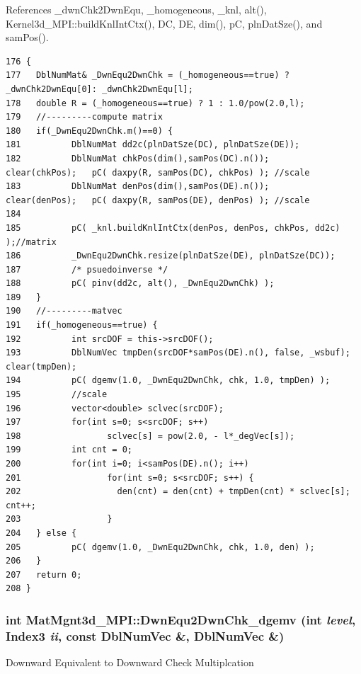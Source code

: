 References \_\-dwn\-Chk2Dwn\-Equ, \_\-homogeneous, \_\-knl, alt(), Kernel3d\_\-MPI::build\-Knl\-Int\-Ctx(), DC, DE, dim(), p\-C, pln\-Dat\-Sze(), and sam\-Pos().

\footnotesize\begin{verbatim}176 {
177   DblNumMat& _DwnEqu2DwnChk = (_homogeneous==true) ? _dwnChk2DwnEqu[0]: _dwnChk2DwnEqu[l];
178   double R = (_homogeneous==true) ? 1 : 1.0/pow(2.0,l);
179   //---------compute matrix
180   if(_DwnEqu2DwnChk.m()==0) {    
181          DblNumMat dd2c(plnDatSze(DC), plnDatSze(DE));
182          DblNumMat chkPos(dim(),samPos(DC).n());                clear(chkPos);   pC( daxpy(R, samPos(DC), chkPos) ); //scale
183          DblNumMat denPos(dim(),samPos(DE).n());                clear(denPos);   pC( daxpy(R, samPos(DE), denPos) ); //scale
184          
185          pC( _knl.buildKnlIntCtx(denPos, denPos, chkPos, dd2c) );//matrix
186          _DwnEqu2DwnChk.resize(plnDatSze(DE), plnDatSze(DC));
187          /* psuedoinverse */
188          pC( pinv(dd2c, alt(), _DwnEqu2DwnChk) );
189   }
190   //---------matvec
191   if(_homogeneous==true) {
192          int srcDOF = this->srcDOF();
193          DblNumVec tmpDen(srcDOF*samPos(DE).n(), false, _wsbuf);         clear(tmpDen);
194          pC( dgemv(1.0, _DwnEqu2DwnChk, chk, 1.0, tmpDen) );
195          //scale
196          vector<double> sclvec(srcDOF);
197          for(int s=0; s<srcDOF; s++)
198                 sclvec[s] = pow(2.0, - l*_degVec[s]);
199          int cnt = 0;
200          for(int i=0; i<samPos(DE).n(); i++)
201                 for(int s=0; s<srcDOF; s++) {
202                   den(cnt) = den(cnt) + tmpDen(cnt) * sclvec[s];                  cnt++;
203                 }
204   } else {
205          pC( dgemv(1.0, _DwnEqu2DwnChk, chk, 1.0, den) );
206   }
207   return 0;
208 }
\end{verbatim}\normalsize 


\subsubsection{\setlength{\rightskip}{0pt plus 5cm}int Mat\-Mgnt3d\_\-MPI::Dwn\-Equ2Dwn\-Chk\_\-dgemv (int {\em level}, Index3 {\em ii}, const Dbl\-Num\-Vec \&, Dbl\-Num\-Vec \&)}\label{classMatMgnt3d__MPI_87d8ed68b09cff332b257ad098ea81cc_87d8ed68b09cff332b257ad098ea81cc}


Downward Equivalent to Downward Check Multiplcation 

